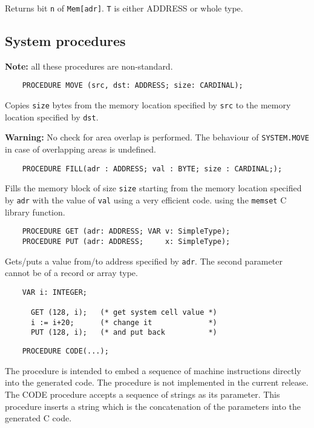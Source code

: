 Returns bit \verb|n| of \verb|Mem[adr]|.
\verb|T| is either ADDRESS or whole type.

\subsection{System procedures}
\label{m2:system_procs}

{\bf Note:} all these procedures are non-standard.

\verb'    PROCEDURE MOVE (src, dst: ADDRESS; size: CARDINAL);'

Copies \verb|size| bytes from the memory location specified
by \verb|src| to the memory location specified by \verb|dst|.

{\bf Warning:} No check for area overlap is performed. The behaviour
of \verb'SYSTEM.MOVE' in case of overlapping areas is undefined.

\verb'    PROCEDURE FILL(adr : ADDRESS; val : BYTE; size : CARDINAL;);'

Fills the memory block of size \verb'size' starting from the memory
location specified by \verb'adr' with the value of \verb'val'
\ifgencode
using a very efficient code.
\else
using the \verb'memset' C library function.
\fi

\verb'    PROCEDURE GET (adr: ADDRESS; VAR v: SimpleType);'\\
\verb'    PROCEDURE PUT (adr: ADDRESS;     x: SimpleType);'

Gets/puts a value from/to address specified by \verb|adr|.
The second parameter cannot be of a record or array type.

\begin{verbatim}
    VAR i: INTEGER;

      GET (128, i);   (* get system cell value *)
      i := i+20;      (* change it             *)
      PUT (128, i);   (* and put back          *)
\end{verbatim}

\verb'    PROCEDURE CODE(...);'

\ifgencode
The procedure is intended to embed a sequence of machine
instructions  directly into the generated code. The procedure is not
implemented in the current release.
\fi
\ifgenc
The CODE procedure accepts a sequence of strings as its
parameter. This procedure inserts a string which is the concatenation
of the parameters into the generated C code.

